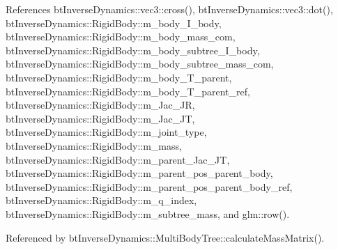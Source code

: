 References btInverseDynamics::vec3::cross(), btInverseDynamics::vec3::dot(), btInverseDynamics::RigidBody::m\_\-body\_\-I\_\-body, btInverseDynamics::RigidBody::m\_\-body\_\-mass\_\-com, btInverseDynamics::RigidBody::m\_\-body\_\-subtree\_\-I\_\-body, btInverseDynamics::RigidBody::m\_\-body\_\-subtree\_\-mass\_\-com, btInverseDynamics::RigidBody::m\_\-body\_\-T\_\-parent, btInverseDynamics::RigidBody::m\_\-body\_\-T\_\-parent\_\-ref, btInverseDynamics::RigidBody::m\_\-Jac\_\-JR, btInverseDynamics::RigidBody::m\_\-Jac\_\-JT, btInverseDynamics::RigidBody::m\_\-joint\_\-type, btInverseDynamics::RigidBody::m\_\-mass, btInverseDynamics::RigidBody::m\_\-parent\_\-Jac\_\-JT, btInverseDynamics::RigidBody::m\_\-parent\_\-pos\_\-parent\_\-body, btInverseDynamics::RigidBody::m\_\-parent\_\-pos\_\-parent\_\-body\_\-ref, btInverseDynamics::RigidBody::m\_\-q\_\-index, btInverseDynamics::RigidBody::m\_\-subtree\_\-mass, and glm::row().

Referenced by btInverseDynamics::MultiBodyTree::calculateMassMatrix().


